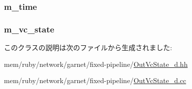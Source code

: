 \hypertarget{classOutVcState__d_ac39faf9ea84c2e7518ba2f960c661636}{
\subsubsection[{m\_\-time}]{ {\bf m\_\-time}}}
\label{classOutVcState__d_ac39faf9ea84c2e7518ba2f960c661636}
\hypertarget{classOutVcState__d_a86eb725d7cda610fb5009d20a3690a4d}{
\subsubsection[{m\_\-vc\_\-state}]{ {\bf m\_\-vc\_\-state}}}
\label{classOutVcState__d_a86eb725d7cda610fb5009d20a3690a4d}


このクラスの説明は次のファイルから生成されました:\begin{DoxyCompactItemize}
\item 
mem/ruby/network/garnet/fixed-\/pipeline/\hyperlink{OutVcState__d_8hh}{OutVcState\_\-d.hh}\item 
mem/ruby/network/garnet/fixed-\/pipeline/\hyperlink{OutVcState__d_8cc}{OutVcState\_\-d.cc}\end{DoxyCompactItemize}
